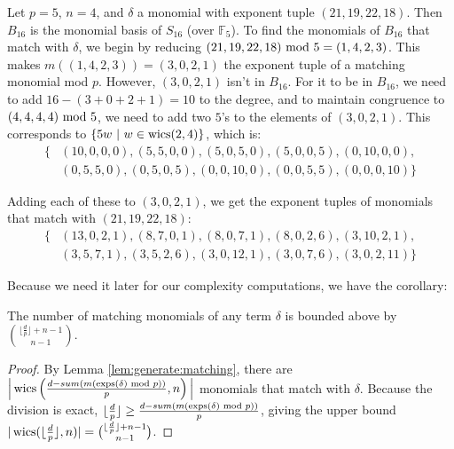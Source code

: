 \begin{ex}
    Let $p = 5$, \(n = 4\), and $\delta$ a monomial 
    with exponent tuple $(21, 19, 22, 18)$. 
    Then $B_{16}$ is the monomial basis of 
    \(S_{16}\) (over $\mathbb{F}_5$). 
    To find the monomials of $B_{16}$ that match with 
    $\delta$, we begin by reducing $(21, 19, 22, 18) \text{ mod } 5 = (1, 4, 2, 3)$.
    This makes $m((1, 4, 2, 3)) = (3, 0, 2, 1)$ the 
    exponent tuple of a matching monomial mod \(p\).
    However, \((3, 0, 2, 1)\) isn't in $B_{16}$. 
    For it to be in $B_{16}$, we need to add $16 - (3 + 0 + 2 + 1) = 10$ 
    to the degree, and to maintain congruence to 
    $(4, 4, 4, 4) \text{ mod } 5$, we need to add two $5$'s 
    to the elements of $(3, 0, 2, 1)$. This corresponds 
    to $\{5w ~|~ w \in \operatorname{wics}(2, 4)\}$, which is:
    \begin{align*}
        \{&(10, 0, 0, 0), (5, 5, 0, 0), (5, 0, 5, 0), (5, 0, 0, 5), (0, 10, 0, 0), \\
        &(0, 5, 5, 0), (0, 5, 0, 5), (0, 0, 10, 0), (0, 0, 5, 5), (0, 0, 0, 10)\}
    \end{align*}
        
    \noindent Adding each of these to $(3, 0, 2, 1)$, we get the 
    exponent tuples of monomials that match with $(21, 19, 22, 18)$:
    \begin{align*}
        \{&(13, 0, 2, 1), (8, 7, 0, 1), (8, 0, 7, 1), (8, 0, 2, 6), (3, 10, 2, 1), \\
        &(3, 5, 7, 1), (3, 5, 2, 6), (3, 0, 12, 1), (3, 0, 7, 6), (3, 0, 2, 11)\}
    \end{align*}    
\end{ex}

Because we need it later for our complexity computations, we have the corollary:

\begin{cor}
    \label{cor:num:matches}
    The number of matching monomials of any term $\delta$ is 
    bounded above by $\binom{\lfloor \frac{d}{p} \rfloor + n - 1}{n - 1}$.
\end{cor}

\begin{proof}
    By Lemma \ref{lem:generate:matching}, there are 
    $\Big |\operatorname{wics} \left(\frac{d - sum(m(\operatorname{exps}(\delta) \text{ mod } p))}{p}, n \right) \Big |$ 
    monomials that match with $\delta$.
    Because the division is exact, 
    $\lfloor \frac{d}{p} \rfloor \geq \frac{d - sum(m(\operatorname{exps}(\delta) \text{ mod } p))}{p}$,
    giving the upper bound 
    $|\operatorname{wics}(\lfloor \frac{d}{p} \rfloor, n)| = \binom{\lfloor \frac{d}{p} \rfloor + n - 1}{n - 1}$.
\end{proof}

